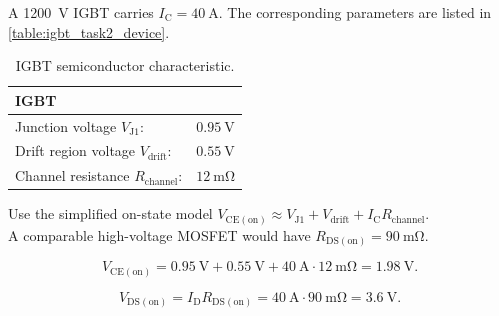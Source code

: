 

A \SI{1200}{\volt} IGBT carries $I_\mathrm{C} = \SI{40}{\ampere}$. The corresponding parameters are listed in \autoref{table:igbt_task2_device}.


\begin{table}[ht]
    \centering
    \begin{tabular}{ll}
        \toprule
        \multicolumn{2}{l}{\textbf{IGBT}}  \\
        \midrule
        Junction voltage $V_\mathrm{J1}$: & $\SI{0.95}{\volt}$ \\
        Drift region voltage $V_\mathrm{drift}$: & $\SI{0.55}{\volt}$ \\
        Channel resistance $R_\mathrm{channel}$: & $\SI{12}{\milli\ohm}$ \\
        \bottomrule
    \end{tabular}
    \caption{IGBT semiconductor characteristic.}
    \label{table:igbt_task2_device}
\end{table}

Use the simplified on-state model $V_\mathrm{CE(on)} \approx V_\mathrm{J1} + V_\mathrm{drift} + I_\mathrm{C} R_\mathrm{channel}$. \\
A comparable high-voltage MOSFET would have $R_\mathrm{DS(on)} = \SI{90}{\milli\ohm}$. \\


\begin{solutionblock}
    \begin{equation}
        V_\mathrm{CE(on)} = \SI{0.95}{\volt} + \SI{0.55}{\volt} + \SI{40}{\ampere} \cdot \SI{12}{\milli\ohm}
        = \SI{1.98}{\volt}.
    \end{equation}
\end{solutionblock}


\begin{solutionblock}
    \begin{equation}
        V_\mathrm{DS(on)} = I_\mathrm{D} R_\mathrm{DS(on)}
        = \SI{40}{\ampere} \cdot \SI{90}{\milli\ohm}
        = \SI{3.6}{\volt}.
    \end{equation}
\end{solutionblock}

